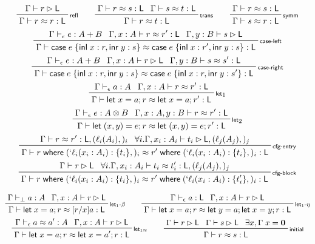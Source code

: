 \documentclass[acmsmall,screen,review]{acmart}
\newcommand{\mb}[1]{\ensuremath{\mathbf{#1}}}
\newcommand{\ms}[1]{\ensuremath{\mathsf{#1}}}
\newcommand{\lbl}[1]{{`#1}}
\newcommand{\lto}{:}
\newcommand{\linl}[1]{\ms{inl}\;{#1}}
\newcommand{\linr}[1]{\ms{inr}\;{#1}}
\newcommand{\caseexpr}[5]{\ms{case}\;#1\;\{\linl{#2} \lto #3, \linr{#4} \lto #5\}}
\newcommand{\letstmt}[3]{\ensuremath{\ms{let}\;#1 = #2; #3}}
\newcommand{\where}[2]{#1\;\ms{where}\;#2}
\newcommand{\wbranch}[3]{#1(#2) \lto \{#3\}}
\newcommand{\lwbranch}[3]{\wbranch{\lbl{#1}}{#2}{#3}}
\newcommand{\bhyp}[2]{#1 : #2}
\newcommand{\lhyp}[2]{#1(#2)}
\newcommand{\rle}[1]{{\scriptsize\textsf{#1}}}
\newcommand{\hasty}[4]{#1 \vdash_{#2} #3: {#4}}
\newcommand{\haslb}[3]{#1 \vdash #2 \rhd #3}
\newcommand{\teqv}{\approx}
\newcommand{\tmeq}[5]{#1 \vdash_{#2} #3 \teqv #4 : {#5}}
\newcommand{\lbeq}[4]{#1 \vdash #2 \teqv #3 : {#4}}
\begin{document}
\begin{gather*}
  \prftree[r]{\rle{refl}}{\haslb{\Gamma}{r}{\ms{L}}}{\lbeq{\Gamma}{r}{r}{\ms{L}}} \qquad
  \prftree[r]{\rle{trans}}{\lbeq{\Gamma}{r}{s}{\ms{L}}}{\lbeq{\Gamma}{s}{t}{\ms{L}}}
    {\lbeq{\Gamma}{r}{t}{\ms{L}}} \qquad
  \prftree[r]{\rle{symm}}{\lbeq{\Gamma}{r}{s}{\ms{L}}}{\lbeq{\Gamma}{s}{r}{\ms{L}}}
  \\
  \prftree[r]{\rle{case-left}}
    {\hasty{\Gamma}{\epsilon}{e}{A + B}}
    {\lbeq{\Gamma, \bhyp{x}{A}}{r}{r'}{\ms{L}}}
    {\haslb{\Gamma, \bhyp{y}{B}}{s}{\ms{L}}}
    {\lbeq{\Gamma}{\caseexpr{e}{x}{r}{y}{s}}{\caseexpr{e}{x}{r'}{y}{s}}{\ms{L}}}
  \\
  \prftree[r]{\rle{case-right}}
    {\hasty{\Gamma}{\epsilon}{e}{A + B}}
    {\haslb{\Gamma, \bhyp{x}{A}}{r}{\ms{L}}}
    {\lbeq{\Gamma, \bhyp{y}{B}}{s}{s'}{\ms{L}}}
    {\lbeq{\Gamma}{\caseexpr{e}{x}{r}{y}{s}}{\caseexpr{e}{x}{r}{y}{s'}}{\ms{L}}}
  \\
  \prftree[r]{\rle{let}$_1$}
    {\hasty{\Gamma}{\epsilon}{a}{A}}
    {\lbeq{\Gamma, \bhyp{x}{A}}{r}{r'}{\ms{L}}}
    {\lbeq{\Gamma}{\letstmt{x}{a}{r}}{\letstmt{x}{a}{r'}}{\ms{L}}}
  \\
  \prftree[r]{\rle{let}$_2$}
    {\hasty{\Gamma}{\epsilon}{e}{A \otimes B}}
    {\lbeq{\Gamma, \bhyp{x}{A}, \bhyp{y}{B}}{r}{r'}{\ms{L}}}
    {\lbeq{\Gamma}{\letstmt{(x, y)}{e}{r}}{\letstmt{(x, y)}{e}{r'}}{\ms{L}}}
  \\
  \prftree[r]{\rle{cfg-entry}}
    {\lbeq{\Gamma}{r}{r'}{\ms{L}, (\lhyp{\ell_i}{A_i},)_i}}
    {\forall i. \haslb{\Gamma, \bhyp{x_i}{A_i}}{t_i}{\ms{L}, (\lhyp{\ell_j}{A_j},)_j}}
    {\lbeq{\Gamma}
      {\where{r}{(\lwbranch{\ell_i}{x_i: A_i}{t_i},)_i}}
      {\where{r'}{(\lwbranch{\ell_i}{x_i: A_i}{t_i},)_i}}
      {\ms{L}}
    }
  \\
  \prftree[r]{\rle{cfg-block}}
    {\haslb{\Gamma}{r}{\ms{L}}}
    {\forall i. \lbeq{\Gamma, \bhyp{x_i}{A_i}}{t_i}{t_i'}{\ms{L}, (\lhyp{\ell_j}{A_j},)_j}}
    {\lbeq{\Gamma}
      {\where{r}{(\lwbranch{\ell_i}{x_i: A_i}{t_i},)_i}}
      {\where{r'}{(\lwbranch{\ell_i}{x_i: A_i}{t_i'},)_i}}
      {\ms{L}}
    }
\end{gather*}

\begin{gather*}
  \prftree[r]{\rle{let$_1$-$\beta$}}
    {\hasty{\Gamma}{\bot}{a}{A}}
    {\haslb{\Gamma, \bhyp{x}{A}}{r}{\ms{L}}}
    {\lbeq{\Gamma}{\letstmt{x}{a}{r}}{[r/x]a}{\ms{L}}}
  \qquad
  \prftree[r]{\rle{let$_1$-$\eta$}}
    {\hasty{\Gamma}{\epsilon}{a}{\ms{L}}}
    {\haslb{\Gamma, \bhyp{x}{A}}{r}{\ms{L}}}
    {\lbeq{\Gamma}{\letstmt{x}{a}{r}}{\letstmt{y}{a}{\letstmt{x}{y}{r}}}{\ms{L}}}
  \\
  \prftree[r]{\rle{let$_{1\approx}$}}
    {\tmeq{\Gamma}{\epsilon}{a}{a'}{A}}
    {\haslb{\Gamma, \bhyp{x}{A}}{r}{\ms{L}}}
    {\lbeq{\Gamma}{\letstmt{x}{a}{r}}{\letstmt{x}{a'}{r}}{\ms{L}}}
  \qquad
  \prftree[r]{\rle{initial}}
    {\haslb{\Gamma}{r}{\ms{L}}}
    {\haslb{\Gamma}{s}{\ms{L}}}
    {\exists x, \Gamma\;x = \mb{0}}
    {\lbeq{\Gamma}{r}{s}{\ms{L}}}
\end{gather*}
\end{document}
